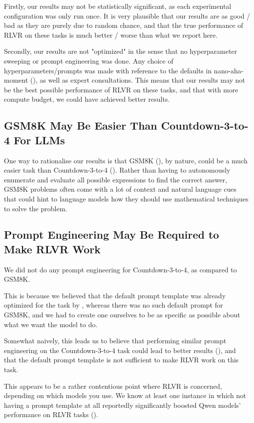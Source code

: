\documentclass{article} %
\theoremstyle{definition}
\begin{document}
Firstly, our results may not be statistically significant, as each experimental configuration
was only run once. It is very plausible that our results are as good / bad as they are purely due to 
random chance, and that the true performance of RLVR on these tasks is much better / worse than what we report here.

Secondly, our results are not "optimized" in the sense that no hyperparameter sweeping
or prompt engineering was done.
Any choice of hyperparameters/prompts was made with reference to the defaults in nano-aha-moment 
(\cite{nano-aha-moment}), as well as expert consultations.
This means that our results may not be the best possible performance of RLVR on these tasks,
and that with more compute budget, we could have achieved better results.

\subsection{GSM8K May Be Easier Than Countdown-3-to-4 For LLMs}
One way to rationalise our results is that GSM8K (\cite{gsm8k}), by nature, could be a much easier task than 
Countdown-3-to-4 (\cite{countdown}). Rather than having to autonomously enumerate and evaluate all possible expressions
to find the correct answer, GSM8K problems often come with a lot of context and 
natural language cues that could hint to language models how they should use
mathematical techniques to solve the problem.

\subsection{Prompt Engineering May Be Required to Make RLVR Work}

We did not do any prompt engineering for Countdown-3-to-4, as compared to GSM8K.

This is because we believed that the default prompt template was already optimized for the task by \cite{nano-aha-moment},
whereas there was no such default prompt for GSM8K, and we had to create one ourselves
to be as specific as possible about what we want the model to do.

Somewhat naively, this leads us to believe that performing similar prompt engineering
on the Countdown-3-to-4 task could lead to better results (\cite{Chen-2025}), and that the default prompt template
is not sufficient to make RLVR work on this task.

This appears to be a rather contentious point where RLVR is concerned, 
depending on which models you use. We know at least one instance in which
not having a prompt template at all reportedly significantly boosted Qwen models' performance on 
RLVR tasks (\cite{Liu-et-al-2025}).
\end{document}
